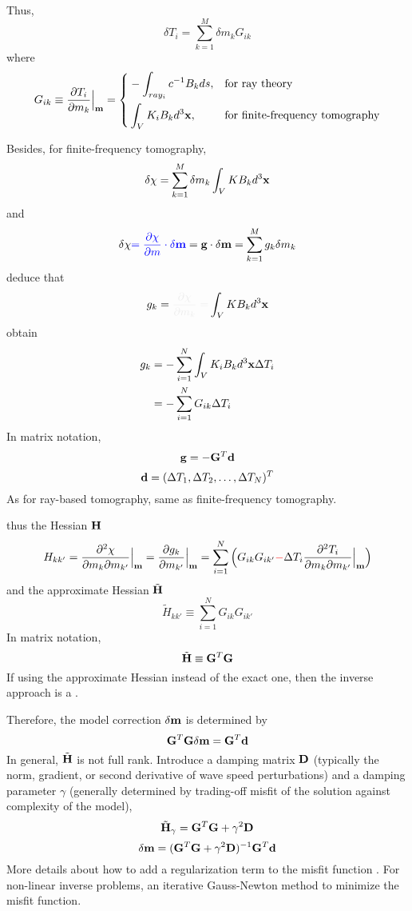 Thus,
\[ \delta T_i=\sum_{k=1}^M\delta m_kG_{ik} \]
where
\begin{equation*}
  G_{ik}\equiv\frac{\partial T_i}{\partial m_k}\Big|_{\mathbf{m}}=\left\{
  \begin{aligned}
    & -\int_{ray_i}c^{-1}B_kds, & & \text{for ray theory} \\
    & \int_VK_iB_kd^3\mathbf{x}, & & \text{for finite-frequency tomography} \\
  \end{aligned} \right.
\end{equation*}

Besides, for finite-frequency tomography,
\[ \delta\chi=\sum_{k=1}^M\delta m_k\int_VKB_kd^3\mathbf{x} \]
and
\[ \delta\chi{\color{blue}=\frac{\partial\chi}{\partial m}\cdot\delta\mathbf{m}}=\mathbf{g}\cdot\delta\mathbf{m}=\sum_{k=1}^Mg_k\delta m_k \]
deduce that
\[ g_k=\myde{\frac{\partial\chi}{\partial m_k}=}\int_VKB_kd^3\mbf x \]
obtain
\begin{align*}
  g_k & =-\sum_{i=1}^N\int_VK_iB_kd^3\mathbf{x}\Delta T_i \\
  & =-\sum_{i=1}^NG_{ik}\Delta T_i \\
\end{align*}
In matrix notation,
\[ \mathbf{g}=-\mathbf{G}^T\mathbf{d} \]
\[ \mathbf{d}=(\Delta T_1,\Delta T_2,\ldots,\Delta T_N)^T \]
As for ray-based tomography, same as finite-frequency tomography.

thus the Hessian $\mathbf{H}$
\[ H_{kk'}=\frac{\partial^2\chi}{\partial m_k\partial m_{k'}}\Big|_{\mathbf{m}}=\frac{\partial g_k}{\partial m_{k'}}\Big|_{\mathbf{m}}=\sum_{i=1}^N\Big(G_{ik}G_{ik'}{\color{red}-}\Delta T_i\frac{\partial^2T_i}{\partial m_k\partial m_{k'}}\Big|_{\mathbf{m}}\Big) \]
and the approximate Hessian $\tilde{\mathbf{H}}$
\[ \tilde H_{kk'}\equiv\sum_{i=1}^NG_{ik}G_{ik'} \]
In matrix notation,
\[ \tilde{\mathbf{H}}\equiv\mathbf{G}^T\mathbf{G} \]
If using the approximate Hessian instead of the exact one,
then the inverse approach is a .

Therefore, the model correction $\delta\mathbf{m}$ is determined by
\[ \mathbf{G}^T\mathbf{G}\delta\mathbf{m}=\mathbf{G}^T\mathbf{d} \]
In general, $\tilde{\mathbf{H}}$ is not full rank.
Introduce a damping matrix $\mathbf{D}$
(typically the norm, gradient, or second derivative of wave speed perturbations)
and a damping parameter $\gamma$
(generally determined by trading-off misfit of the solution against complexity of the model),
\[ \tilde{\mathbf{H}}_\gamma=\mathbf{G}^T\mathbf{G}+\gamma^2\mathbf{D} \]
\[ \delta\mathbf{m}=(\mathbf{G}^T\mathbf{G}+\gamma^2\mathbf{D})^{-1}\mathbf{G}^T\mathbf{d} \]
More details about how to add a regularization term to the misfit function
.
For non-linear inverse problems, an iterative Gauss-Newton method to minimize the misfit function.


